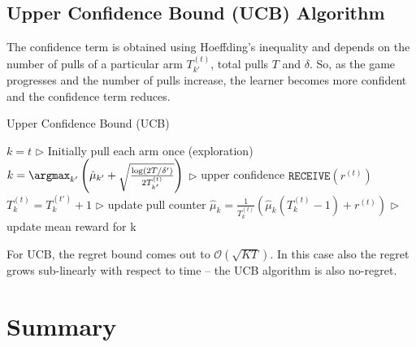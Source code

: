 \documentclass[11pt]{article}
\begin{document}
\subsection{Upper Confidence Bound (UCB) Algorithm}
The confidence term is obtained using Hoeffding's inequality and depends on the number of pulls
of a particular arm $T_{k'}^{(t)}$, total pulls $T$ and $\delta$. So, as the game progresses and
the number of pulls increase, the learner becomes more confident and the confidence term
reduces.
\begin{algorithm}[H]
\caption{Upper Confidence Bound (UCB)}
\label{algo:ucb}
\begin{algorithmic}[1]
\STATE $k = t$ \hfill $\triangleright$ Initially pull each arm once (exploration)
\ELSE
\STATE $k = \argmax_{k'} \left(\hat{\mu}_{k'
} + \sqrt{\frac{\log(2T/\delta')}{2T_{k'}^{(t)}}} \right)$ \hfill $\triangleright$ upper confidence
\ENDIF
\STATE $\mathtt{RECEIVE}(r^{(t)})$
\STATE $T_k^{(t)} = T_k^{(t')} + 1$  \hfill $\triangleright$ update pull counter
\STATE $\hat{\mu}_{k} = \frac{1}{T_k^{(t)}}\left(\hat{\mu}_{k}(T_k^{(t)} - 1) + r^{(t)}\right)$ \hfill $\triangleright$ update mean reward for k
\ENDFOR
\end{algorithmic}
\end{algorithm}

For UCB, the regret bound comes out to $\mathcal{O}(\sqrt{KT})$. In this case also the regret
grows sub-linearly with respect to time -- the UCB algorithm is also no-regret.




\section{Summary}

\end{document}
